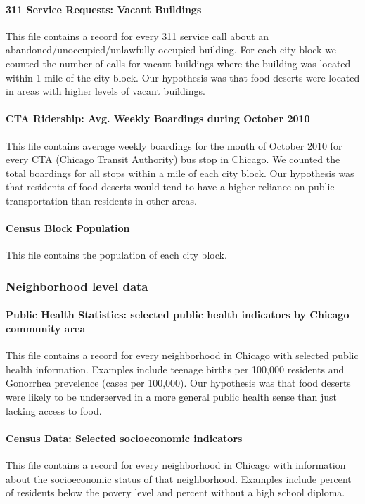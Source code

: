 \documentclass{report}
\begin{document}
\paragraph{ 311 Service Requests: Vacant Buildings}
This file contains a record for every 311 service call about an abandoned/unoccupied/unlawfully occupied building. For each city block we counted the number of calls for vacant buildings where the building was located within 1 mile of the city block. Our hypothesis was that food deserts were located in areas with higher levels of vacant buildings. 

\paragraph{ CTA Ridership: Avg. Weekly Boardings during October 2010}
This file contains average weekly boardings for the month of October 2010 for every CTA (Chicago Transit Authority) bus stop in Chicago. We counted the total boardings for all stops within a mile of each city block. Our hypothesis was that residents of food deserts would tend to have a higher reliance on public transportation than residents in other areas. 

\paragraph{ Census Block Population  }
This file contains the population of each city block. 

\subsubsection*{Neighborhood level data}

\paragraph{ Public Health Statistics: selected public health indicators by Chicago community area}
This file contains a record for every neighborhood in Chicago with selected public health information. Examples include teenage births per 100,000 residents and Gonorrhea prevelence (cases per 100,000). Our hypothesis was that food deserts were likely to be underserved in a more general public health sense than just lacking access to food. 

\paragraph{ Census Data: Selected socioeconomic indicators    }
This file contains a record for every neighborhood in Chicago with information about the socioeconomic status of that neighborhood. Examples include percent of residents below the povery level and percent without a high school diploma. 
\end{document}
